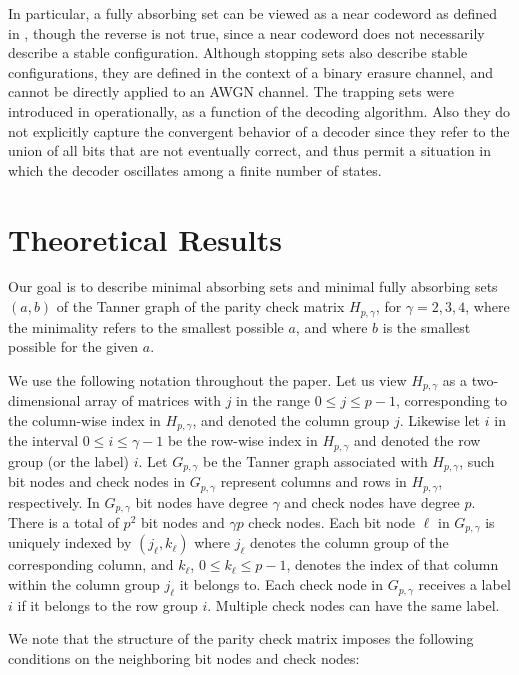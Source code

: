 In particular, a fully absorbing set can be viewed as a near
codeword as defined in \cite{mackay}, though the reverse is not
true, since a near codeword does not necessarily describe a stable
configuration. Although stopping sets \cite{di_stop} also describe
stable configurations, they are defined in the context of a binary
erasure channel, and cannot be directly applied to an AWGN
channel. The trapping sets were introduced in \cite{richardson}
operationally, as a function of the decoding algorithm. Also they
do not explicitly capture the convergent behavior of a decoder
since they refer to the union of all bits that are not eventually
correct, and thus permit a situation in which the decoder
oscillates among a finite number of states.

\section{Theoretical Results}\label{theo1}

Our goal is to describe minimal absorbing sets and minimal fully
absorbing sets $(a,b)$ of the Tanner graph of the parity check
matrix $H_{p,\gamma}$, for $\gamma =2,3,4$, where the minimality
refers to the smallest possible $a$, and where $b$ is the smallest
possible for the given $a$.

We use the following notation throughout the paper. Let us view
$H_{p,\gamma}$ as a two-dimensional array of matrices with $j$ in
the range $0 \leq j \leq p-1$, corresponding to the column-wise
index in $H_{p,\gamma}$, and denoted the column group $j$.
Likewise let $i$ in the interval $0 \leq i \leq \gamma-1$ be the
row-wise index in $H_{p,\gamma}$ and denoted the row group (or the
label) $i$. Let $G_{p,\gamma}$ be the Tanner graph associated with
$H_{p,\gamma}$, such bit nodes and check nodes in $G_{p,\gamma}$
represent columns and rows in $H_{p,\gamma}$, respectively. In
$G_{p,\gamma}$ bit nodes have degree $\gamma$ and check nodes have
degree $p$. There is a total of $p^2$ bit nodes and $\gamma p$
check nodes. Each bit node $\ell$ in $G_{p,\gamma}$ is uniquely
indexed by $(j_\ell,k_\ell)$ where $j_\ell$ denotes the column
group of the corresponding column, and $k_\ell$, $0 \leq k_\ell
\leq p-1$, denotes the index of that column within the column
group $j_\ell$ it belongs to. Each check node in $G_{p,\gamma}$
receives a label $i$ if it belongs to the row group $i$. Multiple
check nodes can have the same label.

We note that the structure of the parity check matrix imposes the
following conditions on the neighboring bit nodes and check nodes:


